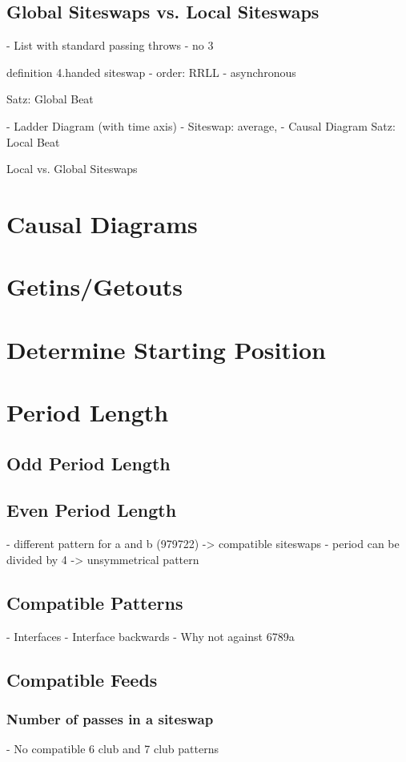 \documentclass[a4paper,12pt,parskip=full]{scrreprt}
\begin{document}
	
	\subsection{Global Siteswaps vs. Local Siteswaps}
	
	
	- List with standard passing throws
		- no 3
	
	definition 4.handed siteswap
		- order: RRLL
		- asynchronous
	
	Satz: Global Beat
	
	
	- Ladder Diagram (with time axis)
	- Siteswap: average, 
	- Causal Diagram
	Satz: Local Beat
	
	Local vs. Global Siteswaps
	
	\section{Causal Diagrams}
	
	\section{Getins/Getouts}
	\section{Determine Starting Position}
	\section{Period Length}
	\subsection{Odd Period Length}
	\subsection{Even Period Length}
	 - different pattern for a and b (979722) -> compatible siteswaps
	 - period can be divided by 4 -> unsymmetrical pattern
	\subsection{Compatible Patterns}
	 - Interfaces
	 - Interface backwards
	 - Why not against 6789a
	\subsection{Compatible Feeds}
	\subsubsection{Number of passes in a siteswap}
	- No compatible 6 club and 7 club patterns
\end{document}
